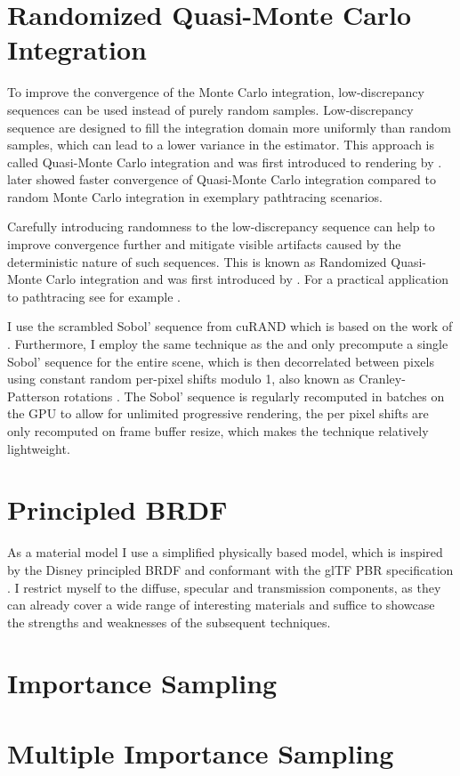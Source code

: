 \section{Randomized Quasi-Monte Carlo Integration}

To improve the convergence of the Monte Carlo integration, low-discrepancy sequences can be used instead of purely random samples.
Low-discrepancy sequence are designed to fill the integration domain more uniformly than random samples, which can lead to a lower variance in the estimator.
This approach is called Quasi-Monte Carlo integration and was first introduced to rendering by \textcite{heinrich1994a}.
\textcite{keller1996a} later showed faster convergence of Quasi-Monte Carlo integration compared to random Monte Carlo integration in exemplary pathtracing scenarios.

Carefully introducing randomness to the low-discrepancy sequence can help to improve convergence further and mitigate visible artifacts caused by the deterministic nature of such sequences.
This is known as Randomized Quasi-Monte Carlo integration and was first introduced by \textcite{owen1995}.
For a practical application to pathtracing see for example \textcite{burley2020}.

I use the scrambled Sobol' sequence from cuRAND  which is based on the work of \textcite{owen2008}.
Furthermore, I employ the same technique as the \textcite{blenderfoundation} and only precompute a single Sobol' sequence for the entire scene, which is then decorrelated between pixels using constant random per-pixel shifts modulo 1, also known as Cranley-Patterson rotations .
The Sobol' sequence is regularly recomputed in batches on the GPU to allow for unlimited progressive rendering, the per pixel shifts are only recomputed on frame buffer resize, which makes the technique relatively lightweight.

\section{Principled BRDF}

As a material model I use a simplified physically based model, which is inspired by the Disney principled BRDF  and conformant with the glTF PBR specification .
I restrict myself to the diffuse, specular and transmission components, as they can already cover a wide range of interesting materials and suffice to showcase the strengths and weaknesses of the subsequent techniques.

\section{Importance Sampling}

\section{Multiple Importance Sampling}